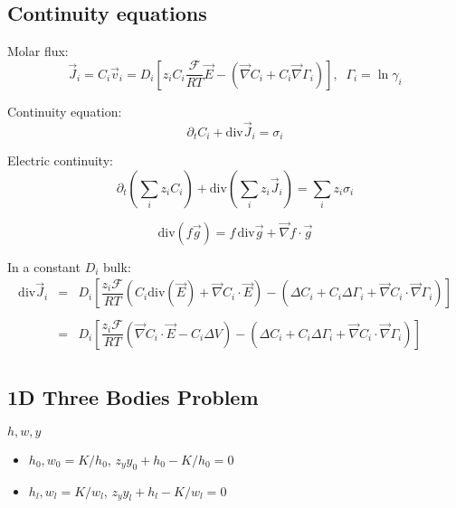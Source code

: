 \documentclass[aps,12pt]{revtex4}
\begin{document}
\subsection{Continuity equations}

Molar flux:
\begin{equation}
	\vec{J}_i = C_i \vec{v}_i = D_i \left[z_i C_i  \dfrac{\mathcal{F}}{RT} \vec{E} - \left(\vec{\nabla} C_i + C_i \vec{\nabla}\Gamma_i\right) \right],\;\;\Gamma_i = \ln \gamma_i
\end{equation}

Continuity equation:
\begin{equation}
	\partial_t C_i + \mathrm{div} \vec{J}_i = \sigma_i
\end{equation}

Electric continuity:
\begin{equation}
	\partial_t \left(\sum_i z_i C_i\right) + \mathrm{div} \left(\sum_i z_i \vec{J}_i\right) = \sum_i z_i \sigma_i
\end{equation}


\begin{equation}
	\mathrm{div}(f\vec{g}) = f \, \mathrm{div}\vec{g} + \vec{\nabla} f \cdot \vec{g}
\end{equation}

In a constant $D_i$ bulk:
\begin{equation}
\begin{array}{rcl}
\mathrm{div} \vec{J}_i & = & D_i \left[ \dfrac{z_i\mathcal{F}}{RT} 
\left(C_i \mathrm{div}\left(\vec{E}\right) + \vec{\nabla} C_i \cdot \vec{E} \right) 
- \left( \Delta C_i + C_i \Delta \Gamma_i + \vec{\nabla} C_i \cdot \vec{\nabla} \Gamma_i \right)
\right]\\
\\
 & = &  D_i \left[ \dfrac{z_i\mathcal{F}}{RT} 
\left(  \vec{\nabla} C_i \cdot \vec{E} - C_i \Delta V \right) 
- \left( \Delta C_i + C_i \Delta \Gamma_i + \vec{\nabla} C_i \cdot \vec{\nabla} \Gamma_i \right)
\right]\\
\end{array}
\end{equation}

\subsection{1D Three Bodies Problem}

$h,w,y$
\begin{itemize}
\item $h_0,w_0=K/h_0$, $z_y y_0+h_0-K/h_0=0$
\item $h_l,w_l=K/w_l$, $z_y y_l+h_l-K/w_l=0$
\end{itemize}
\end{document}
